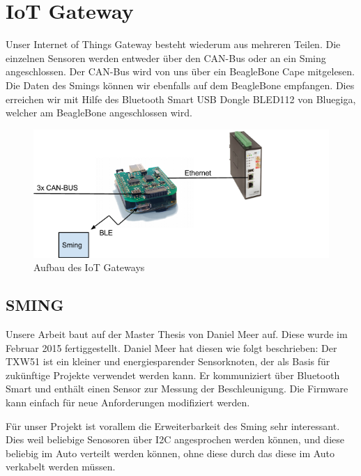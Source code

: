 \chapter{IoT Gateway}\label{chap:iotgateway}

Unser Internet of Things Gateway besteht wiederum aus mehreren Teilen. Die einzelnen Sensoren werden entweder über den CAN-Bus oder an ein Sming angeschlossen. Der CAN-Bus wird von uns über ein BeagleBone Cape mitgelesen. Die Daten des Smings können wir ebenfalls auf dem BeagleBone empfangen. Dies erreichen wir mit Hilfe des Bluetooth Smart USB Dongle BLED112 von Bluegiga, welcher am BeagleBone angeschlossen wird.

\begin{figure}[hbtp]
    \center
    \includegraphics[width=\textwidth]{bilder/aufbau_in_auto.png}
    \caption{Aufbau des IoT Gateways}
    \label{fig:aufbau_iot_gateway}
\end{figure}


\section{SMING}\label{sec:sming}
Unsere Arbeit baut auf der Master Thesis von Daniel Meer auf. Diese wurde im Februar 2015 fertiggestellt. Daniel Meer hat diesen wie folgt beschrieben: Der TXW51 ist ein kleiner und energiesparender Sensorknoten, der als Basis für zukünftige Projekte verwendet werden kann. Er kommuniziert über Bluetooth Smart und enthält einen Sensor zur Messung der Beschleunigung. Die Firmware kann einfach für neue Anforderungen modifiziert werden.

Für unser Projekt ist vorallem die Erweiterbarkeit des Sming sehr interessant. Dies weil beliebige Senosoren über I2C angesprochen werden können, und diese beliebig im Auto verteilt werden können, ohne diese durch das diese im Auto verkabelt werden müssen.



